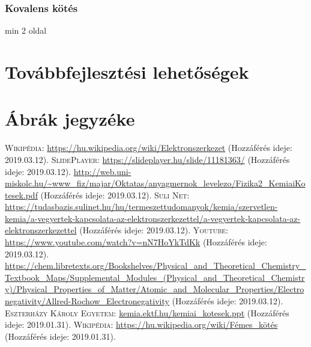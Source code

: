 \documentclass[colorlinks]{thesis-ekf}
\theoremstyle{definition}
\theoremstyle{remark}
\begin{document}
\subsection{Kovalens kötés}
min 2 oldal
\chapter{Továbbfejlesztési lehetőségek}
\chapter{Ábrák jegyzéke}
\begin{thebibliography}{1}
	 \textsc{Wikipédia}: \url{https://hu.wikipedia.org/wiki/Elektronszerkezet} (Hozzáférés ideje: 2019.03.12).
	 \textsc{SlidePlayer}: \url{https://slideplayer.hu/slide/11181363/} (Hozzáférés ideje: 2019.03.12).
	 \url{http://web.uni-miskolc.hu/~www_fiz/majar/Oktatas/anyagmernok_levelezo/Fizika2_KemiaiKotesek.pdf} (Hozzáférés ideje: 2019.03.12).
	 \textsc{Suli Net}: \url{https://tudasbazis.sulinet.hu/hu/termeszettudomanyok/kemia/szervetlen-kemia/a-vegyertek-kapcsolata-az-elektronszerkezettel/a-vegyertek-kapcsolata-az-elektronszerkezettel} (Hozzáférés ideje: 2019.03.12).
	 \textsc{Youtube}: \url{https://www.youtube.com/watch?v=nN7HoYkTdKk} (Hozzáférés ideje: 2019.03.12).
	 \url{https://chem.libretexts.org/Bookshelves/Physical_and_Theoretical_Chemistry_Textbook_Maps/Supplemental_Modules_(Physical_and_Theoretical_Chemistry)/Physical_Properties_of_Matter/Atomic_and_Molecular_Properties/Electronegativity/Allred-Rochow_Electronegativity} (Hozzáférés ideje: 2019.03.12).
	 \textsc{Eszterházy Károly Egyetem}: \url{kemia.ektf.hu/kemiai_kotesek.ppt} (Hozzáférés ideje: 2019.01.31).
	 \textsc{Wikipédia}: \url{https://hu.wikipedia.org/wiki/Fémes_kötés} (Hozzáférés ideje: 2019.01.31).
\end{thebibliography}
\end{document}
